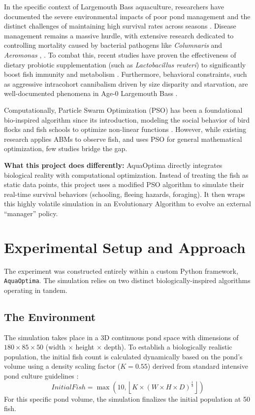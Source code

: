 \documentclass[conference]{IEEEtran}
\begin{document}
In the specific context of Largemouth Bass aquaculture, researchers have documented the severe environmental impacts of poor pond management \cite{zhang} and the distinct challenges of maintaining high survival rates across seasons \cite{vodianitskyi}. Disease management remains a massive hurdle, with extensive research dedicated to controlling mortality caused by bacterial pathogens like \textit{Columnaris} and \textit{Aeromonas} \cite{bowker}, \cite{wang2025}. To combat this, recent studies have proven the effectiveness of dietary probiotic supplementation (such as \textit{Lactobacillus reuteri}) to significantly boost fish immunity and metabolism \cite{li}. Furthermore, behavioral constraints, such as aggressive intracohort cannibalism driven by size disparity and starvation, are well-documented phenomena in Age-0 Largemouth Bass \cite{post}.

Computationally, Particle Swarm Optimization (PSO) has been a foundational bio-inspired algorithm since its introduction, modeling the social behavior of bird flocks and fish schools to optimize non-linear functions \cite{kennedy1995}. However, while existing research applies ABMs to observe fish, and uses PSO for general mathematical optimization, few studies bridge the gap.

\textbf{What this project does differently:} AquaOptima directly integrates biological reality with computational optimization. Instead of treating the fish as static data points, this project uses a modified PSO algorithm to simulate their real-time survival behaviors (schooling, fleeing hazards, foraging). It then wraps this highly volatile simulation in an Evolutionary Algorithm to evolve an external ``manager'' policy.

\section{Experimental Setup and Approach}
The experiment was constructed entirely within a custom Python framework, \texttt{AquaOptima}. The simulation relies on two distinct biologically-inspired algorithms operating in tandem.

\subsection{The Environment}
The simulation takes place in a 3D continuous pond space with dimensions of $180 \times 85 \times 50$ (width $\times$ height $\times$ depth). To establish a biologically realistic population, the initial fish count is calculated dynamically based on the pond's volume using a density scaling factor ($K = 0.55$) derived from standard intensive pond culture guidelines \cite{tidwell}:
\begin{equation}
\boxed{
InitialFish = \max\left(10, \left\lfloor K \times (W \times H \times D)^{\frac{1}{3}} \right\rfloor\right)
}
\end{equation}
For this specific pond volume, the simulation finalizes the initial population at 50 fish.
\end{document}
